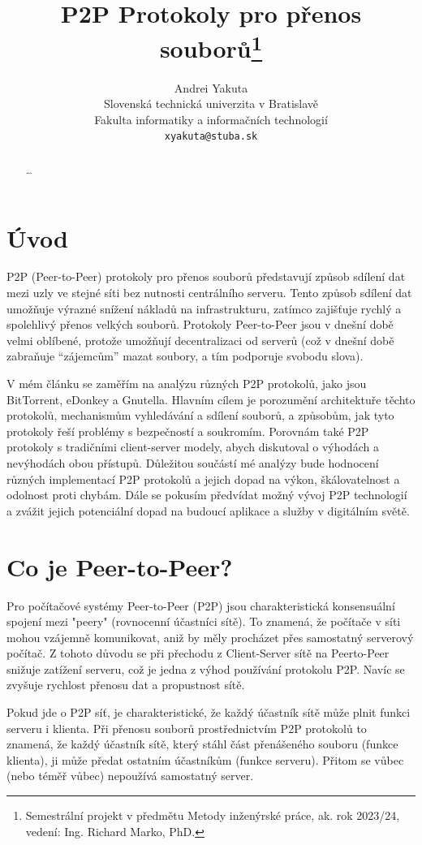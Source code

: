 \documentclass[10pt,twoside,czech,a4paper]{article}
\title{P2P Protokoly pro přenos souborů\thanks{Semestrální projekt v předmětu Metody inženýrské práce, ak. rok 2023/24, vedení: Ing. Richard Marko, PhD.}}
\author{Andrei Yakuta\\[2pt]
	{\small Slovenská technická univerzita v Bratislavě}\\
	{\small Fakulta informatiky a informačních technologií}\\
	{\small \texttt{xyakuta@stuba.sk}}
	}
\begin{document}
\maketitle

\begin{abstract}
\ldots
\end{abstract}



\section{Úvod}

P2P (Peer-to-Peer) protokoly pro přenos souborů představují způsob sdílení dat mezi uzly ve stejné síti bez nutnosti centrálního serveru.
Tento způsob sdílení dat umožňuje výrazné snížení nákladů na infrastrukturu, zatímco zajišťuje rychlý a spolehlivý přenos velkých souborů.
Protokoly Peer-to-Peer jsou v dnešní době velmi oblíbené, protože umožňují decentralizaci od serverů (což v dnešní době zabraňuje “zájemcům” mazat soubory, a tím podporuje svobodu slova).

V mém článku se zaměřím na analýzu různých P2P protokolů, jako jsou BitTorrent, eDonkey a Gnutella.
Hlavním cílem je porozumění architektuře těchto protokolů, mechanismům vyhledávání a sdílení souborů, a způsobům, jak tyto protokoly řeší problémy s bezpečností a soukromím.
Porovnám také P2P protokoly s tradičními client-server modely, abych diskutoval o výhodách a nevýhodách obou přístupů.
Důležitou součástí mé analýzy bude hodnocení různých implementací P2P protokolů a jejich dopad na výkon, škálovatelnost a odolnost proti chybám.
Dále se pokusím předvídat možný vývoj P2P technologií a zvážit jejich potenciální dopad na budoucí aplikace a služby v digitálním světě.


\section{Co je Peer-to-Peer?}

Pro počítačové systémy Peer-to-Peer (P2P) jsou charakteristická konsensuální spojení mezi "peery" (rovnocenní účastníci sítě).
To znamená, že počítače v síti mohou vzájemně komunikovat, aniž by měly procházet přes samostatný serverový počítač\cite{Bauwens2019}.
Z tohoto důvodu se při přechodu z Client-Server sítě na Peerto-Peer snižuje zatížení serveru, což je jedna z výhod používání protokolu P2P.
Navíc se zvyšuje rychlost přenosu dat a propustnost sítě.

Pokud jde o P2P síť, je charakteristické, že každý účastník sítě může plnit funkci serveru i klienta.
Při přenosu souborů prostřednictvím P2P protokolů to znamená, že každý účastník sítě, který stáhl část přenášeného souboru (funkce klienta), ji může předat ostatním účastníkům (funkce serveru).
Přitom se vůbec (nebo téměř vůbec) nepoužívá samostatný server.
\end{document}
